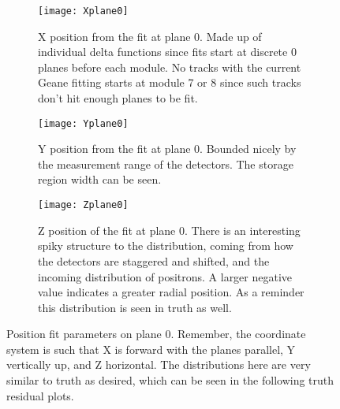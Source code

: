 \begin{figure}
    \centering
    \begin{subfigure}[]{0.55\textwidth}
        \centering
        \texttt{[image: Xplane0]} 
        \caption{X position from the fit at plane 0. Made up of individual delta functions since fits start at discrete 0 planes before each module. No tracks with the current Geane fitting starts at module 7 or 8 since such tracks don't hit enough planes to be fit.}
    \end{subfigure}

    \begin{subfigure}[]{0.55\textwidth}
        \centering
        \texttt{[image: Yplane0]} 
        \caption{Y position from the fit at plane 0. Bounded nicely by the measurement range of the detectors. The storage region width can be seen.}
    \end{subfigure}
    
    \begin{subfigure}[]{0.55\textwidth}
        \centering
        \texttt{[image: Zplane0]} 
        \caption{Z position of the fit at plane 0. There is an interesting spiky structure to the distribution, coming from how the detectors are staggered and shifted, and the incoming distribution of positrons. A larger negative value indicates a greater radial position. As a reminder this distribution is seen in truth as well.}
    \end{subfigure}

    \caption{Position fit parameters on plane 0. Remember, the coordinate system is such that X is forward with the planes parallel, Y vertically up, and Z horizontal. The distributions here are very similar to truth as desired, which can be seen in the following truth residual plots.}
\end{figure}


